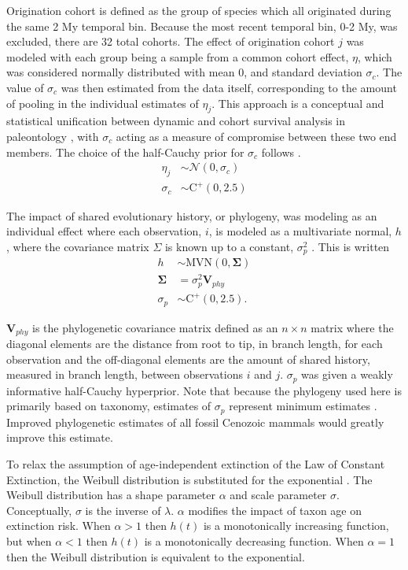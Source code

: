 Origination cohort is defined as the group of species which all originated during the same 2 My temporal bin. Because the most recent temporal bin, 0-2 My, was excluded, there are 32 total cohorts. The effect of origination cohort \(j\) was modeled with each group being a sample from a common cohort effect, \(\eta\), which was considered normally distributed with mean 0, and standard deviation \(\sigma_{c}\). The value of \(\sigma_{c}\) was then estimated from the data itself, corresponding to the amount of pooling in the individual estimates of \(\eta_{j}\). This approach is a conceptual and statistical unification between dynamic and cohort survival analysis in paleontology \cite{Foote1988,Raup1978,Raup1975,VanValen1979,Baumiller1993}, with \(\sigma_{c}\) acting as a measure of compromise between these two end members. The choice of the half-Cauchy prior for \(\sigma_{c}\) follows \cite{Gelman2006a}.
\begin{align*}
  \eta_{j} &\sim \mathcal{N}(0, \sigma_{c}) \\
  \sigma_{c} &\sim \mathrm{C}^{+}(0, 2.5)
\end{align*}

The impact of shared evolutionary history, or phylogeny, was modeling as an individual effect where each observation, \(i\), is modeled as a multivariate normal, \(h\), where the covariance matrix \(\Sigma\) is known up to a constant, \(\sigma_{p}^{2}\) \cite{Lynch1991,Housworth2004}. This is written
\begin{align*}
  h &\sim \mathrm{MVN}(0, \mathbf{\Sigma}) \\
  \mathbf{\Sigma} &= \sigma_{p}^{2} \mathbf{V}_{phy} \\
  \sigma_{p} &\sim \mathrm{C}^{+}(0, 2.5).
\end{align*}

\(\mathbf{V}_{phy}\) is the phylogenetic covariance matrix defined as an \(n \times n\) matrix where the diagonal elements are the distance from root to tip, in branch length, for each observation and the off-diagonal elements are the amount of shared history, measured in branch length, between observations \(i\) and \(j\). \(\sigma_{p}\) was given a weakly informative half-Cauchy hyperprior. Note that because the phylogeny used here is primarily based on taxonomy, estimates of \(\sigma_{p}\) represent minimum estimates \cite{Lynch1991,Housworth2004}. Improved phylogenetic estimates of all fossil Cenozoic mammals would greatly improve this estimate.

To relax the assumption of age-independent extinction of the Law of Constant Extinction, the Weibull distribution is substituted for the exponential \cite{Klein2003}. The Weibull distribution has a shape parameter \(\alpha\) and scale parameter \(\sigma\). Conceptually, \(\sigma\) is the inverse of \(\lambda\). \(\alpha\) modifies the impact of taxon age on extinction risk. When \(\alpha > 1\) then \(h(t)\) is a monotonically increasing function, but when \(\alpha < 1\) then \(h(t)\) is a monotonically decreasing function. When \(\alpha = 1\) then the Weibull distribution is equivalent to the exponential.

